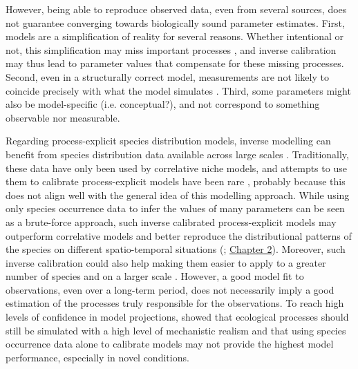 However, being able to reproduce observed data, even from several sources, does not guarantee converging towards biologically sound parameter estimates. First, models are a simplification of reality for several reasons. Whether intentional or not, this simplification may miss important processes \citep{Forrester2021}, and inverse calibration may thus lead to parameter values that compensate for these missing processes. Second, even in a structurally correct model, measurements are not likely to coincide precisely with what the model simulates \citep{Zhang2024}. Third, some parameters might also be model-specific (i.e. conceptual?), and not correspond to something observable nor measurable.

Regarding process-explicit species distribution models, inverse modelling can benefit from species distribution data available across large scales \citep{Evans2016}. Traditionally, these data have only been used by correlative niche models, and attempts to use them to calibrate process-explicit models have been rare \citep{Higgins2012, VanderMeersch2023}, probably because this does not align well with the general idea of this modelling approach. While using only species occurrence data to infer the values of many parameters can be seen as a brute-force approach, such inverse calibrated process-explicit models may outperform correlative models and better reproduce the distributional patterns of the species on different spatio-temporal situations (\citealp{Higgins2020, VanderMeersch2024}; \hyperref[chapter2]{Chapter 2}).  Moreover, such inverse calibration could also help making them easier to apply to a greater number of species and on a larger scale \citep[e.g.][]{Conradi2024}. However, a good model fit to observations, even over a long-term period, does not necessarily imply a good estimation of the processes truly responsible for the observations. 
To reach high levels of confidence in model projections,  \cite{VanderMeersch2024} showed that ecological processes should still be simulated with a high level of mechanistic realism and that using species occurrence data alone to calibrate models may not provide the highest model performance, especially in novel conditions. 

